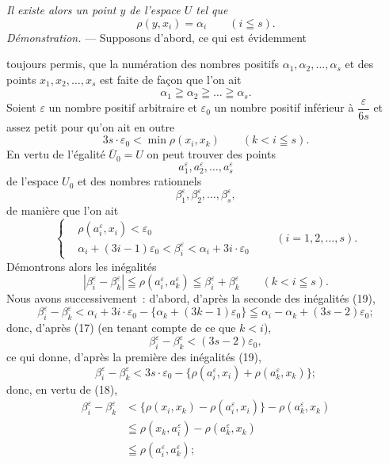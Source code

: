 \documentclass[a4paper,12pt]{amsart}
\newcommand{\srcpage}[1]{} %
\begin{document}
\textit{Il existe alors un point $y$ de l'espace $U$ tel que}
\[
\rho(y,x_i)=\alpha_i\qquad(i\leqq s).
\]
\textit{Démonstration.} --- Supposons d'abord, ce qui est évidemment
\srcpage{59}
toujours permis, que la numération des nombres positifs $\alpha_1,\alpha_2,\dots,\alpha_s$ et des points $x_1,x_2,\dots,x_s$ est faite de façon que l'on ait
\begin{equation}\tag{17}
\alpha_1\geqq\alpha_2\geqq\dots\geqq\alpha_s.
\end{equation}
Soient $\varepsilon$ un nombre positif arbitraire et $\varepsilon_0$ un nombre positif inférieur à $\dfrac{\varepsilon}{6s}$ et assez petit pour qu'on ait en outre
\begin{equation}\tag{18}
3s\cdot\varepsilon_0<\min\rho(x_i,x_k)\qquad(k<i\leqq s).
\end{equation}
En vertu de l'égalité $\overline{U}_0=U$ on peut trouver des points
\[
a_1^\varepsilon,a_2^\varepsilon,\dots,a_s^\varepsilon
\]
de l'espace $U_0$ et des nombres rationnels
\[
\beta_1^\varepsilon,\beta_2^\varepsilon,\dots,\beta_s^\varepsilon,
\]
de manière que l'on ait
\begin{equation}\tag{19}
\left\{\begin{aligned}
&\rho(a_i^\varepsilon,x_i)<\varepsilon_0\\
&\alpha_i+(3i-1)\varepsilon_0<\beta_i^\varepsilon<\alpha_i+3i\cdot\varepsilon_0
\end{aligned}\right.\qquad(i=1,2,\dots,s).
\end{equation}
Démontrons alors les inégalités
\begin{equation}\tag{$\Delta^*_\varepsilon$}
|\beta_i^\varepsilon-\beta_k^\varepsilon|\leqq\rho(a_i^\varepsilon,a_k^\varepsilon)
\leqq\beta_i^\varepsilon+\beta_k^\varepsilon\qquad(k<i\leqq s).
\end{equation}
Nous avons successivement~: d'abord, d'après la seconde des inégalités (19),
\[
\beta_i^\varepsilon-\beta_k^\varepsilon
<\alpha_i+3i\cdot\varepsilon_0-\{\alpha_k+(3k-1)\varepsilon_0\}
\leqq\alpha_i-\alpha_k+(3s-2)\varepsilon_0;
\]
donc, d'après (17) (en tenant compte de ce que $k<i$),
\[
\beta_i^\varepsilon-\beta_k^\varepsilon<(3s-2)\varepsilon_0,
\]
ce qui donne, d'après la première des inégalités (19),
\[
\beta_i^\varepsilon-\beta_k^\varepsilon<3s\cdot\varepsilon_0
-\{\rho(a_i^\varepsilon,x_i)+\rho(a_k^\varepsilon,x_k)\};
\]
donc, en vertu de (18),
\begin{equation}\tag{20}
\begin{aligned}
\beta_i^\varepsilon-\beta_k^\varepsilon
&<\{\rho(x_i,x_k)-\rho(a_i^\varepsilon,x_i)\}-\rho(a_k^\varepsilon,x_k)\\
&\leqq\rho(x_k,a_i^\varepsilon)-\rho(a_k^\varepsilon,x_k)\\
&\leqq\rho(a_i^\varepsilon,a_k^\varepsilon);
\end{aligned}
\end{equation}
\end{document}
